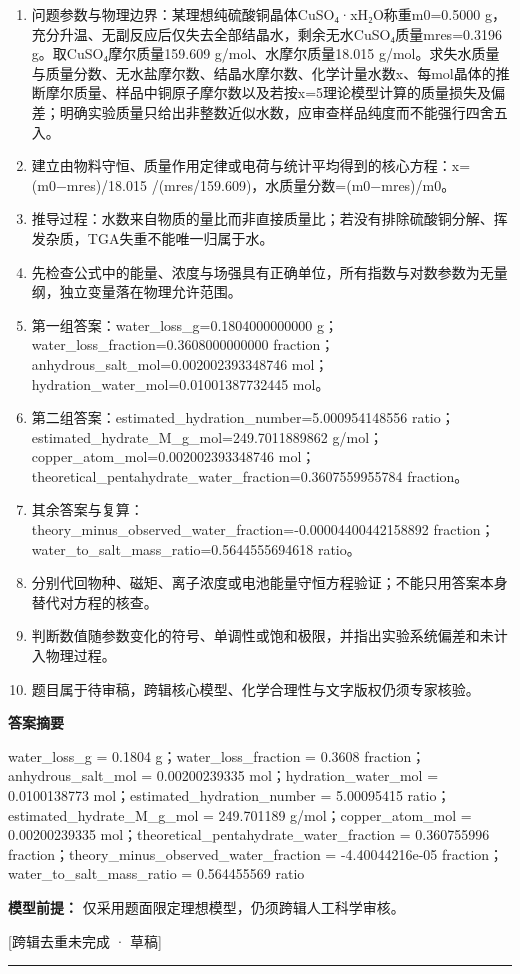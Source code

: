 \documentclass[UTF8,11pt,a4paper]{ctexart}
\begin{document}
\begin{enumerate}
\item 问题参数与物理边界：某理想纯硫酸铜晶体CuSO₄·xH₂O称重m0=0.5000 g，充分升温、无副反应后仅失去全部结晶水，剩余无水CuSO₄质量mres=0.3196 g。取CuSO₄摩尔质量159.609 g/mol、水摩尔质量18.015 g/mol。求失水质量与质量分数、无水盐摩尔数、结晶水摩尔数、化学计量水数x、每mol晶体的推断摩尔质量、样品中铜原子摩尔数以及若按x=5理论模型计算的质量损失及偏差；明确实验质量只给出非整数近似水数，应审查样品纯度而不能强行四舍五入。
\item 建立由物料守恒、质量作用定律或电荷与统计平均得到的核心方程：x=(m0−mres)/18.015 /(mres/159.609)，水质量分数=(m0−mres)/m0。
\item 推导过程：水数来自物质的量比而非直接质量比；若没有排除硫酸铜分解、挥发杂质，TGA失重不能唯一归属于水。
\item 先检查公式中的能量、浓度与场强具有正确单位，所有指数与对数参数为无量纲，独立变量落在物理允许范围。
\item 第一组答案：water\_loss\_g=0.1804000000000 g；water\_loss\_fraction=0.3608000000000 fraction；anhydrous\_salt\_mol=0.002002393348746 mol；hydration\_water\_mol=0.01001387732445 mol。
\item 第二组答案：estimated\_hydration\_number=5.000954148556 ratio；estimated\_hydrate\_M\_g\_mol=249.7011889862 g/mol；copper\_atom\_mol=0.002002393348746 mol；theoretical\_pentahydrate\_water\_fraction=0.3607559955784 fraction。
\item 其余答案与复算：theory\_minus\_observed\_water\_fraction=-0.00004400442158892 fraction；water\_to\_salt\_mass\_ratio=0.5644555694618 ratio。
\item 分别代回物种、磁矩、离子浓度或电池能量守恒方程验证；不能只用答案本身替代对方程的核查。
\item 判断数值随参数变化的符号、单调性或饱和极限，并指出实验系统偏差和未计入物理过程。
\item 题目属于待审稿，跨辑核心模型、化学合理性与文字版权仍须专家核验。
\end{enumerate}
\noindent\textbf{答案摘要}\par
water\_loss\_g = 0.1804 g；water\_loss\_fraction = 0.3608 fraction；anhydrous\_salt\_mol = 0.00200239335 mol；hydration\_water\_mol = 0.0100138773 mol；estimated\_hydration\_number = 5.00095415 ratio；estimated\_hydrate\_M\_g\_mol = 249.701189 g/mol；copper\_atom\_mol = 0.00200239335 mol；theoretical\_pentahydrate\_water\_fraction = 0.360755996 fraction；theory\_minus\_observed\_water\_fraction = -4.40044216e-05 fraction；water\_to\_salt\_mass\_ratio = 0.564455569 ratio\par
\noindent\textbf{模型前提：}
仅采用题面限定理想模型，仍须跨辑人工科学审核。\par
\noindent\textcolor{red!65!black}{[跨辑去重未完成 · 草稿]} \par
\medskip\hrule\medskip
{}
\end{document}
